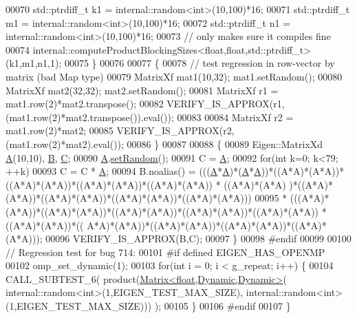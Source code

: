 \begin{DoxyCode}
00070     std::ptrdiff\_t k1 = internal::random<int>(10,100)*16;
00071     std::ptrdiff\_t m1 = internal::random<int>(10,100)*16;
00072     std::ptrdiff\_t n1 = internal::random<int>(10,100)*16;
00073     \textcolor{comment}{// only makes sure it compiles fine}
00074     internal::computeProductBlockingSizes<float,float,std::ptrdiff\_t>(k1,m1,n1,1);
00075   \}
00076 
00077   \{
00078     \textcolor{comment}{// test regression in row-vector by matrix (bad Map type)}
00079     MatrixXf mat1(10,32); mat1.setRandom();
00080     MatrixXf mat2(32,32); mat2.setRandom();
00081     MatrixXf r1 = mat1.row(2)*mat2.transpose();
00082     VERIFY\_IS\_APPROX(r1, (mat1.row(2)*mat2.transpose()).eval());
00083 
00084     MatrixXf r2 = mat1.row(2)*mat2;
00085     VERIFY\_IS\_APPROX(r2, (mat1.row(2)*mat2).eval());
00086   \}
00087 
00088   \{
00089     Eigen::MatrixXd \hyperlink{group___core___module_class_eigen_1_1_matrix}{A}(10,10), \hyperlink{group___core___module_class_eigen_1_1_matrix}{B}, \hyperlink{group___core___module}{C};
00090     \hyperlink{group___core___module_class_eigen_1_1_matrix}{A}.\hyperlink{class_eigen_1_1_plain_object_base_af0e576a0e1aefc9ee346de44cc352ba3}{setRandom}();
00091     C = \hyperlink{group___core___module_class_eigen_1_1_matrix}{A};
00092     \textcolor{keywordflow}{for}(\textcolor{keywordtype}{int} k=0; k<79; ++k)
00093       C = C * \hyperlink{group___core___module_class_eigen_1_1_matrix}{A};
00094     B.noalias() = (((\hyperlink{group___core___module_class_eigen_1_1_matrix}{A}*\hyperlink{group___core___module_class_eigen_1_1_matrix}{A})*(\hyperlink{group___core___module_class_eigen_1_1_matrix}{A}*\hyperlink{group___core___module_class_eigen_1_1_matrix}{A}))*((A*A)*(A*A))*((A*A)*(A*A))*((A*A)*(A*A))*((A*A)*(A*A)) * ((A*A)*(A*A)
      )*((A*A)*(A*A))*((A*A)*(A*A))*((A*A)*(A*A))*((A*A)*(A*A)))
00095                 * (((A*A)*(A*A))*((A*A)*(A*A))*((A*A)*(A*A))*((A*A)*(A*A))*((A*A)*(A*A)) * ((A*A)*(A*A))*((
      A*A)*(A*A))*((A*A)*(A*A))*((A*A)*(A*A))*((A*A)*(A*A)));
00096     VERIFY\_IS\_APPROX(B,C);
00097   \}
00098 \textcolor{preprocessor}{#endif}
00099 
00100   \textcolor{comment}{// Regression test for bug 714:}
00101 \textcolor{preprocessor}{#if defined EIGEN\_HAS\_OPENMP}
00102   omp\_set\_dynamic(1);
00103   \textcolor{keywordflow}{for}(\textcolor{keywordtype}{int} i = 0; i < g\_repeat; i++) \{
00104     CALL\_SUBTEST\_6( product(\hyperlink{group___core___module_class_eigen_1_1_matrix}{Matrix<float,Dynamic,Dynamic>}(
      internal::random<int>(1,EIGEN\_TEST\_MAX\_SIZE), internal::random<int>(1,EIGEN\_TEST\_MAX\_SIZE))) );
00105   \}
00106 \textcolor{preprocessor}{#endif}
00107 \}
\end{DoxyCode}
